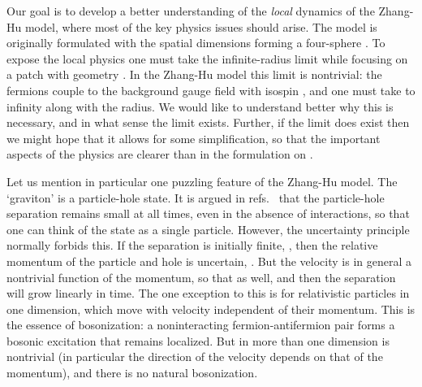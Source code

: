 \documentclass[a4paper,12pt]{article}
\providecommand{\R}{R}
\begin{document}
Our goal is to develop a better understanding of the {\it local}
dynamics of the Zhang-Hu model, where most of the key
physics issues should arise.
The model is originally formulated with the spatial dimensions forming a
four-sphere \coordHE{}.  To expose the local physics one must take the
infinite-radius limit while focusing on a patch with geometry \myHighlight{$\R^4$}\coordHE{}.
In the Zhang-Hu model this limit is nontrivial: the fermions couple to
the background gauge field with isospin \coordHE{}, and one must take \coordHE{}
to infinity along with the radius.  We would like to understand better why
this is necessary, and in what sense the limit exists.  Further, if the
limit does exist then we might hope that it allows for some simplification,
so that the important aspects of the physics are clearer than in the
formulation on \coordHE{}.

Let us mention in particular one puzzling feature of the Zhang-Hu model.
The `graviton' is a particle-hole state.  It is
argued in refs.~\cite{hz1,hz2} that the particle-hole separation remains
small at all times, even in the absence of interactions, so that one can
think of the state as a single particle.  
However, the uncertainty principle normally forbids this.  If the separation
is initially finite, \coordHE{}, then the relative
momentum of the particle and hole is uncertain, \coordHE{}.  But
the velocity is in general a nontrivial function of the momentum, so that
\coordHE{} as well, and then the separation will grow linearly in
time.  The one exception to this is for relativistic particles in one
dimension, which move with velocity \coordHE{} independent of their momentum.
This is the essence of bosonization: a noninteracting fermion-antifermion pair
forms a bosonic excitation that remains localized.  But in more than one
dimension \coordHE{} is nontrivial (in particular the
direction of the velocity depends on that of the momentum), and there is no
natural bosonization.
\end{document}

